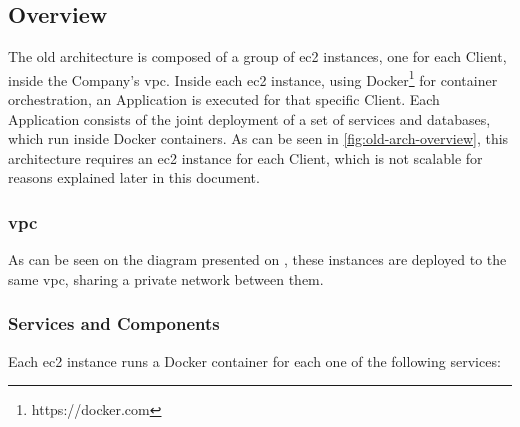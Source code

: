 \subsection{Overview}\label{methodology:ss:overview}

The old architecture is composed of a group of \gls{ec2} instances, one for each Client, inside the Company's \gls{vpc}. Inside each \gls{ec2} instance, using Docker\footnote{https://docker.com}\label{foot:docker} for container orchestration, an Application is executed for that specific Client. Each Application consists of the joint deployment of a set of services and databases, which run inside Docker containers. As can be seen in \cref{fig:old-arch-overview}, this architecture requires an \gls{ec2} instance for each Client, which is not scalable for reasons explained later in this document. 

\subsubsection{\gls{vpc}}\label{methodology:sss:vpc}

 As can be seen on the diagram presented on , these instances are deployed to the same \gls{vpc}, sharing a private network between them.

\subsubsection{Services and Components}\label{methodology:sss:services-and-components}





Each \gls{ec2} instance runs a Docker container for each one of the following services:
 
